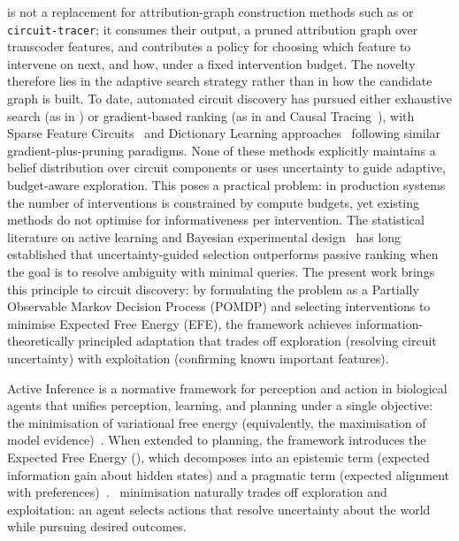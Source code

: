  \ACD{} is not a replacement for
attribution-graph construction methods such as \EAP{} or \texttt{circuit-tracer};
it consumes their output, a pruned attribution graph over transcoder features, and
contributes a policy for choosing which feature to intervene on next, and how, under
a fixed intervention budget. The novelty therefore lies in the adaptive search
strategy rather than in how the candidate graph is built.
To date, automated circuit discovery has pursued either exhaustive search (as in
\ACDC) or gradient-based ranking (as in \EAP and Causal Tracing~\cite{Meng2022}),
with Sparse Feature Circuits~\cite{marks2024sparse} and Dictionary Learning
approaches~\cite{He2024} following similar gradient-plus-pruning paradigms. None of
these methods explicitly maintains a belief distribution over circuit components or
uses uncertainty to guide adaptive, budget-aware exploration. This poses a practical
problem: in production systems the number of interventions is constrained by
compute budgets, yet existing methods do not optimise for informativeness per
intervention. The statistical literature on active learning and Bayesian experimental
design~\cite{MacKay2003} has long established that uncertainty-guided selection
outperforms passive ranking when the goal is to resolve ambiguity with minimal
queries. The present work brings this principle to circuit discovery: by formulating
the problem as a Partially Observable Markov Decision Process (POMDP) and selecting
interventions to minimise Expected Free Energy (EFE), the framework achieves
information-theoretically principled adaptation that trades off exploration
(resolving circuit uncertainty) with exploitation (confirming known important
features).

Active Inference is a normative framework for perception and action in biological
agents that unifies perception, learning, and planning under a single objective: the
minimisation of variational free energy (equivalently, the maximisation of model
evidence)~\cite{Friston2010,Parr2022}. When extended to planning, the framework
introduces the Expected Free Energy (\EFE), which decomposes into an epistemic term
(expected information gain about hidden states) and a pragmatic term (expected
alignment with preferences)~\cite{Friston2015,DaCosta2020}. \EFE\
minimisation naturally trades off exploration and exploitation: an agent selects
actions that resolve uncertainty about the world while pursuing desired outcomes.


